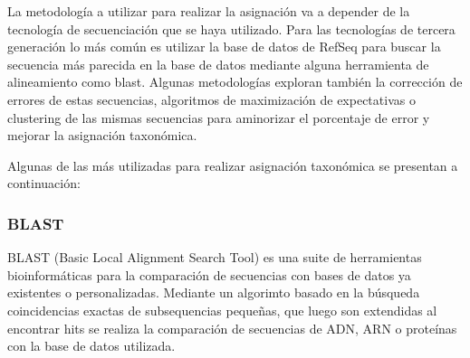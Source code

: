 La metodología a utilizar para realizar la asignación va a depender de la tecnología de secuenciación que se haya utilizado. %
Para las tecnologías de tercera generación lo más común es utilizar la base de datos de RefSeq para buscar la secuencia más parecida en la base de datos mediante alguna herramienta de alineamiento como blast.
Algunas metodologías exploran también la corrección de errores de estas secuencias, algoritmos de maximización de expectativas o clustering de las mismas secuencias para aminorizar el porcentaje de error y mejorar la asignación taxonómica. 

Algunas de las más utilizadas para realizar asignación taxonómica se presentan a continuación:


\subsubsection{BLAST}
BLAST (Basic Local Alignment Search Tool)  es una suite de herramientas bioinformáticas para la comparación de secuencias con bases de datos ya existentes o personalizadas.
Mediante un algorimto basado en la búsqueda coincidencias exactas de subsequencias pequeñas, que luego son extendidas al encontrar hits se realiza la comparación de secuencias de ADN, ARN o proteínas con la base de datos utilizada.
